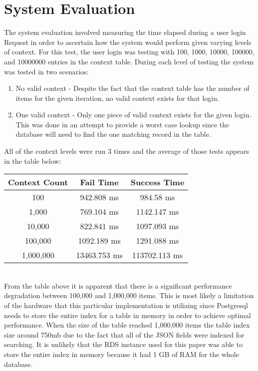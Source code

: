 \documentclass[11pt,journal]{IEEEtran}
\begin{document}
\section{System Evaluation}
The system evaluation involved measuring the time elapsed during a user login Request in order to ascertain how the system would perform given varying levels of context.  For this test, the user login was testing with 100, 1000, 10000, 100000, and 10000000 entries in the context table.  During each level of testing the system was tested in two scenarios:

\begin{enumerate}
	\item No valid context - Despite the fact that the context table has the number of items for the given iteration, no valid context exists for that login.
	\item One valid context - Only one piece of valid context exists for the given login.  This was done in an attempt to provide a worst case lookup since the database will need to find the one matching record in the table.
\end{enumerate}

All of the context levels were run 3 times and the average of those tests appears in the table below:\\

\begin{tabular}{|c|c|c|}
	\hline 
	\rule[-1ex]{0pt}{2.5ex} Context Count & Fail Time & Success Time \\ 
	\hline 
	\rule[-1ex]{0pt}{2.5ex} 100 & 942.808 ms & 984.58 ms \\ 
	\hline 
	\rule[-1ex]{0pt}{2.5ex} 1,000 & 769.104 ms & 1142.147 ms \\ 
	\hline 
	\rule[-1ex]{0pt}{2.5ex} 10,000 & 822.841 ms & 1097.093 ms \\ 
	\hline 
	\rule[-1ex]{0pt}{2.5ex} 100,000 & 1092.189 ms & 1291.088 ms \\ 
	\hline 
	\rule[-1ex]{0pt}{2.5ex} 1,000,000 & 13463.753 ms & 113702.113 ms \\ 
	\hline 
\end{tabular}\\

From the table above it is apparent that there is a significant performance degradation between 100,000 and 1,000,000 items.  This is most likely a limitation of the hardware that this particular implementation is utilizing since Postgresql needs to store the entire index for a table in memory in order to achieve optimal performance.  When the size of the table reached 1,000,000 items the table index size around 750mb due to the fact that all of the JSON fields were indexed for searching.  It is unlikely that the RDS instance used for this paper was able to store the entire index in memory because it had 1 GB of RAM for the whole database.
\end{document}
